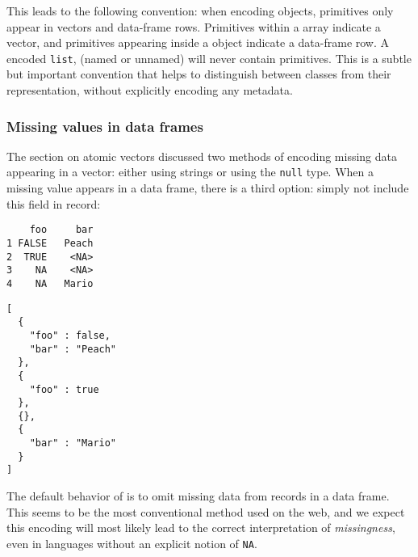  This leads to the following convention: when encoding \R objects, \JSON primitives only appear in vectors and data-frame rows. Primitives within a \JSON array indicate a vector, and primitives appearing inside a \JSON object indicate a data-frame row. A \JSON encoded \texttt{list}, (named or unnamed) will never contain \JSON primitives. This is a subtle but important convention that helps to distinguish between \R classes from their \JSON representation, without explicitly encoding any metadata.

\subsubsection{Missing values in data frames}

The section on atomic vectors discussed two methods of encoding missing data appearing in a vector: either using strings or using the \JSON \texttt{null} type. When a missing value appears in a data frame, there is a third option: simply not include this field in \JSON record:

\begin{knitrout}\mycodesize
{}\color{fgcolor}\begin{kframe}
\begin{alltt}
 \hlkwb{<-} \hlstd{(} \hlstd{=} \hlstd{(}\hlstd{,} \hlstd{,} \hlstd{,} \hlstd{),}  \hlstd{=} \hlstd{(}\hlstd{,} \hlstd{,} \hlstd{,} \hlstd{))}
\end{alltt}
\begin{verbatim}
    foo     bar
1 FALSE   Peach
2  TRUE    <NA>
3    NA    <NA>
4    NA   Mario
\end{verbatim}
\begin{alltt}
\hlstd{(}  \hlstd{=} \hlstd{))}
\end{alltt}
\begin{verbatim}
[
  {
    "foo" : false,
    "bar" : "Peach"
  },
  {
    "foo" : true
  },
  {},
  {
    "bar" : "Mario"
  }
]
\end{verbatim}
\end{kframe}
\end{knitrout}


 The default behavior of \jsonlite is to omit missing data from records in a data frame. This seems to be the most conventional method used on the web, and we expect this encoding will most likely lead to the correct interpretation of \emph{missingness}, even in languages without an explicit notion of \texttt{NA}.

